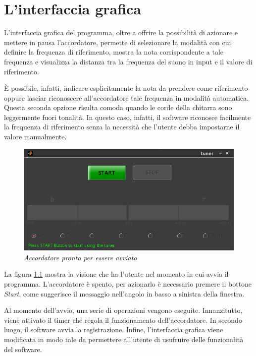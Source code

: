 \chapter{L'interfaccia grafica}\label{cap:interfaccia}

L'interfaccia grafica del programma, oltre a offrire la possibilità di azionare e mettere in pausa l'accordatore, permette di selezionare la modalità con cui definire la frequenza di riferimento, mostra la nota corrispondente a tale frequenza e visualizza la distanza tra la frequenza del suono in input e il valore di riferimento.

È possibile, infatti, indicare esplicitamente la nota da prendere come riferimento oppure lasciar riconoscere all'accordatore tale frequenza in modalità automatica.
Questa seconda opzione risulta comoda quando le corde della chitarra sono leggermente fuori tonalità.
In questo caso, infatti, il software riconosce facilmente la frequenza di riferimento senza la necessità che l'utente debba impostarne il valore manualmente.

	\begin{figure}[h]
	  \begin{center} 
	    \includegraphics[width=\textwidth*\real{0.8}]{images/ch_07/accordatore_fermo.png}
	  \end{center} 
	  \caption{\textit{Accordatore pronto per essere avviato}}  
	  \label{fig:accordatore_fermo}
	\end{figure}

La figura \ref{fig:accordatore_fermo} mostra la visione che ha l'utente nel momento in cui avvia il programma.
L'accordatore è spento, per azionarlo è necessario premere il bottone \emph{Start}, come suggerisce il messaggio nell'angolo in basso a sinistra della finestra.

Al momento dell'avvio, una serie di operazioni vengono eseguite.
Innanzitutto, viene attivato il timer che regola il funzionamento dell'accordatore.
In secondo luogo, il software avvia la registrazione.
Infine, l'interfaccia grafica viene modificata in modo tale da permettere all'utente di usufruire delle funzionalità del software.

